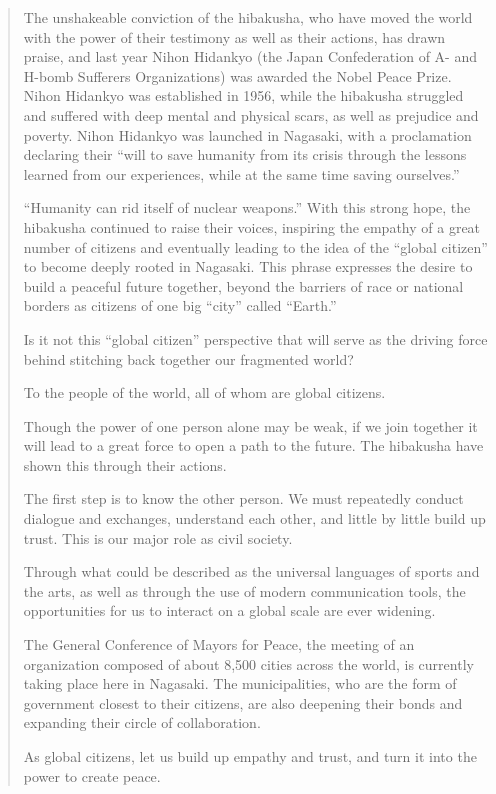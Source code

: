 \begin{quote}
The unshakeable conviction of the hibakusha, who have moved the world with the power of their testimony as well as their actions, has drawn praise, and last year Nihon Hidankyo (the Japan Confederation of A- and H-bomb Sufferers Organizations) was awarded the Nobel Peace Prize. Nihon Hidankyo was established in 1956, while the hibakusha struggled and suffered with deep mental and physical scars, as well as prejudice and poverty. Nihon Hidankyo was launched in Nagasaki, with a proclamation declaring their “will to save humanity from its crisis through the lessons learned from our experiences, while at the same time saving ourselves.”

“Humanity can rid itself of nuclear weapons.” With this strong hope, the hibakusha continued to raise their voices, inspiring the empathy of a great number of citizens and eventually leading to the idea of the “global citizen” to become deeply rooted in Nagasaki. This phrase expresses the desire to build a peaceful future together, beyond the barriers of race or national borders as citizens of one big “city” called “Earth.”

Is it not this “global citizen” perspective that will serve as the driving force behind stitching back together our fragmented world?

To the people of the world, all of whom are global citizens.

Though the power of one person alone may be weak, if we join together it will lead to a great force to open a path to the future. The hibakusha have shown this through their actions.

The first step is to know the other person. We must repeatedly conduct dialogue and exchanges, understand each other, and little by little build up trust. This is our major role as civil society.

Through what could be described as the universal languages of sports and the arts, as well as through the use of modern communication tools, the opportunities for us to interact on a global scale are ever widening.

The General Conference of Mayors for Peace, the meeting of an organization composed of about 8,500 cities across the world, is currently taking place here in Nagasaki. The municipalities, who are the form of government closest to their citizens, are also deepening their bonds and expanding their circle of collaboration.

As global citizens, let us build up empathy and trust, and turn it into the power to create peace.


\end{quote}
